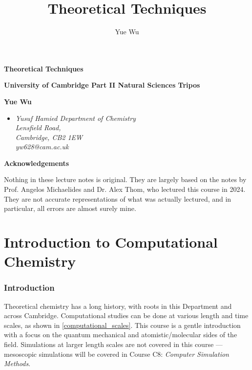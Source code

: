 \documentclass{article}
\title{Theoretical Techniques}
\author{Yue Wu}
\theoremstyle{plain}\theoremheaderfont{\normalfont\itshape}\theorembodyfont{\rmfamily}\theoremseparator{.}\newtheorem*{rem}{Remark}\newtheorem*{ex}{Example}\newtheorem*{proof}{Proof}\newtheorem*{altp}{Alternative proof}
\theoremstyle{plain}\theoremheaderfont{\normalfont\bfseries}\theorembodyfont{\rmfamily}\theoremseparator{.}\newtheorem{thm}{Theorem}[section]\newtheorem{lem}[thm]{Lemma}\newtheorem{prop}[thm]{Proposition}\newtheorem*{cor}{Corollary}\newtheorem{defn}[thm]{Definition}\newtheorem{clm}[thm]{Claim}\newtheorem{clminproof}{Claim}\newtheorem{pos}{Postulate}[section]
\theoremstyle{break}\theoremheaderfont{\normalfont\itshape}\theorembodyfont{\rmfamily}\theoremseparator{.\medskip}\newtheorem*{proofskip}{Proof}\newtheorem*{exs}{Examples}\newtheorem*{rems}{Remarks}
\theoremstyle{break}\theoremheaderfont{\normalfont\bfseries}\theorembodyfont{\rmfamily}\theoremseparator{.\medskip}\newtheorem{lemskip}[thm]{Lemma}\newtheorem{defnskip}[thm]{Definition}\newtheorem{propskip}[thm]{Proposition}\newtheorem{thmskip}[thm]{Theorem}
\numberwithin{equation}{section}
\begin{document}
    \setlength{\parindent}{0pt}
	\Huge\textsf{\textbf{Theoretical Techniques}}
		
	\Large\textsf{\textbf{University of Cambridge Part II Natural Sciences Tripos}}

	\noindent\makebox[\linewidth]{\rule{\textwidth}{2pt}}

	\large\textsf{\textbf{Yue Wu}}
	\begin{itemize}[topsep=0pt,leftmargin=15pt]
		\item[] \textit{Yusuf Hamied Department of Chemistry\\
		Lensfield Road,\\
		Cambridge, CB2 1EW}\\

		\textit{yw628@cam.ac.uk}
	\end{itemize}
    \thispagestyle{empty}
    \setlength{\parindent}{15pt}

    \newpage
    \begin{center}
		\textbf{\Large{Acknowledgements}}
	\end{center}
	\large
	Nothing in these lecture notes is original. They are largely based on the notes by Prof. Angelos Michaelides and Dr. Alex Thom, who lectured this course in 2024. They are not accurate representations of what was actually lectured, and in particular, all errors are almost surely mine.

    \normalsize
	\newpage
	\tableofcontents
	\newpage

    \part{Introduction to Computational Chemistry}
    \section{Introduction}
    Theoretical chemistry has a long history, with roots in this Department and across Cambridge. Computational studies can be done at various length and time scales, as shown in \cref{computational_scales}. This course is a gentle introduction with a focus on the quantum mechanical and atomistic/molecular sides of the field. Simulations at larger length scales are not covered in this course --- mesoscopic simulations will be covered in Course C8: \textit{Computer Simulation Methods}.
\end{document}

